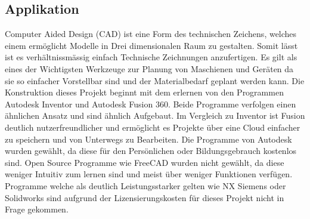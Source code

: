 \subsection{Applikation}
Computer Aided Design (CAD) ist eine Form des technischen Zeichens, welches einem ermöglicht Modelle in Drei dimensionalen Raum zu gestalten. Somit lässt ist es verhältnissmässig einfach Technische Zeichnungen anzufertigen. Es gilt als eines der Wichtigsten Werkzeuge zur Planung von Maschienen und Geräten da sie so einfacher Vorstellbar sind und der Materialbedarf geplant werden kann. Die Konstruktion dieses Projekt beginnt mit dem erlernen von den Programmen Autodesk Inventor und Autodesk Fusion 360. 
Beide Programme verfolgen einen ähnlichen Ansatz und sind ähnlich Aufgebaut. Im Vergleich zu Inventor ist Fusion deutlich nutzerfreundlicher und ermöglicht es Projekte über eine Cloud einfacher zu speichern und von Unterwegs zu Bearbeiten. Die Programme von Autodesk wurden gewählt, da diese für den Persönlichen oder Bildungsgebrauch kostenlos sind. Open Source Programme wie FreeCAD wurden nicht gewählt, da diese weniger Intuitiv zum lernen sind und meist über weniger Funktionen verfügen. Programme welche als deutlich Leistungsstarker gelten wie NX Siemens oder Solidworks sind aufgrund der Lizensierungskosten für dieses Projekt nicht in Frage gekommen. 

